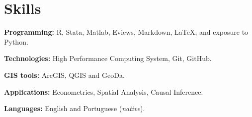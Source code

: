 \documentclass[letterpaper,11pt]{article}
\newcommand{\resumeSubHeadingListStart}{\begin{itemize}[leftmargin=0.15in, label={}]}
\newcommand{\resumeSubHeadingListEnd}{\end{itemize}}
\begin{document}

\section{Skills}
\vspace{2pt}
  
  \resumeSubHeadingListStart
    \small{\item{
        \textbf{Programming:}{ R, Stata, Matlab, Eviews, Markdown, LaTeX, and exposure to Python.} \\ \vspace{3pt}
             
        \textbf{Technologies:}{ High Performance Computing System, Git, GitHub.} \\ \vspace{3pt}

        \textbf{GIS tools:}{ ArcGIS, QGIS and GeoDa.} \\ \vspace{3pt}

        \textbf{Applications:}{ Econometrics, Spatial Analysis, Causal Inference.} \\ \vspace{3pt}
        
        \textbf{Languages:}{ English and Portuguese (\textit{native}).}
        
    }}
  \resumeSubHeadingListEnd



\end{document}
